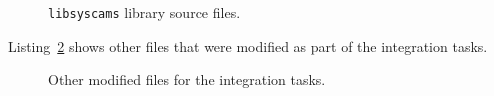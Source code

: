 \begin{figure}[htb]
  \caption{\texttt{libsyscams} library source files.}
  \label{tree:libsyscams}
\end{figure}

Listing~\ref{tree:other_files} shows other files that were modified as part of the integration tasks.

\begin{figure}[H]
  \caption{Other modified files for the integration tasks.}
  \label{tree:other_files}
\end{figure}
